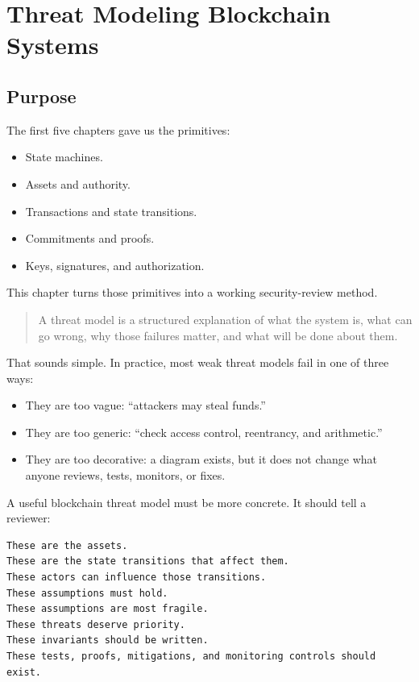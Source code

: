 \chapter{Threat Modeling Blockchain Systems}

\section{Purpose}

The first five chapters gave us the primitives:

\begin{itemize}
\tightlist
\item
  State machines.
\item
  Assets and authority.
\item
  Transactions and state transitions.
\item
  Commitments and proofs.
\item
  Keys, signatures, and authorization.
\end{itemize}

This chapter turns those primitives into a working security-review
method.

\begin{quote}
A threat model is a structured explanation of what the system is, what
can go wrong, why those failures matter, and what will be done about
them.
\end{quote}

That sounds simple. In practice, most weak threat models fail in one of
three ways:

\begin{itemize}
\tightlist
\item
  They are too vague: ``attackers may steal funds.''
\item
  They are too generic: ``check access control, reentrancy, and
  arithmetic.''
\item
  They are too decorative: a diagram exists, but it does not change what
  anyone reviews, tests, monitors, or fixes.
\end{itemize}

A useful blockchain threat model must be more concrete. It should tell a
reviewer:

\begin{lstlisting}
These are the assets.
These are the state transitions that affect them.
These actors can influence those transitions.
These assumptions must hold.
These assumptions are most fragile.
These threats deserve priority.
These invariants should be written.
These tests, proofs, mitigations, and monitoring controls should exist.
\end{lstlisting}

